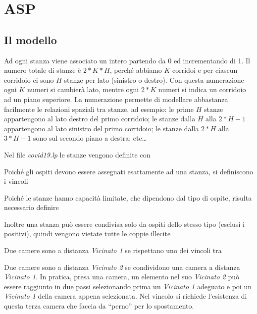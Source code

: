 
\section{ASP}
\subsection{Il modello}

Ad ogni stanza viene associato un intero partendo da 0 ed incrementando di 1.
Il numero totale di stanze è $2*K*H$, perché abbiamo $K$ corridoi e per ciascun corridoio ci sono $H$ stanze per lato (sinistro o destro).
Con questa numerazione ogni $K$ numeri si cambierà lato, mentre ogni $2*K$ numeri si indica un corridoio ad un piano superiore.
La numerazione permette di modellare abbastanza facilmente le relazioni spaziali tra stanze,
ad esempio:
le prime $H$ stanze appartengono al lato destro del primo corridoio;
le stanze dalla $H$ alla $2*H-1$ appartengono al lato sinistro del primo corridoio;
le stanze dalla $2*H$ alla $3*H-1$ sono sul secondo piano a destra; etc\dots

\noindent
Nel file \emph{covid19.lp} le stanze vengono definite con


\noindent
Poiché gli ospiti devono essere assegnati esattamente ad una stanza, si definiscono i vincoli


\noindent
Poiché le stanze hanno capacità limitate, che dipendono dal tipo di ospite, risulta necessario definire


\noindent
Inoltre una stanza può essere condivisa solo da ospiti dello stesso tipo (esclusi i positivi),
quindi vengono vietate tutte le coppie illecite


\noindent
Due camere sono a distanza \emph{Vicinato 1} se rispettano uno dei vincoli tra


\noindent
Due camere sono a distanza \emph{Vicinato 2} se condividono una camera a distanza \emph{Vicinato 1}.
In pratica, presa una camera, un elemento nel suo \emph{Vicinato 2} può essere raggiunto in due passi selezionando prima un \emph{Vicinato 1} adeguato e poi un \emph{Vicinato 1} della camera appena selezionata.
Nel vincolo si richiede l'esistenza di questa terza camera che faccia da ``perno'' per lo spostamento.


